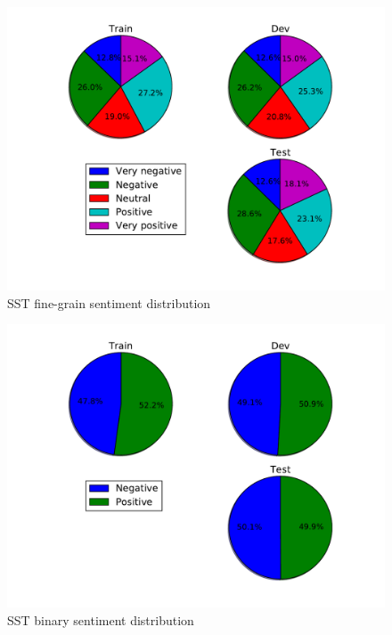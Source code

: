 \begin{figure}[H]
	\begin{minipage}{\textwidth}
		\centering
		\includegraphics[width=0.9\linewidth]{figure/sstfinegrain}
		\caption[SST fine-grain sentiment distribution]{SST fine-grain sentiment distribution}
		\label{fig:sstfinegrain}
	\end{minipage}
\end{figure}

\begin{figure}[H]
	\begin{minipage}{\textwidth}
		\centering
		\includegraphics[width=0.9\linewidth]{figure/sstbinary}
		\caption[SST binary sentiment distribution]{SST binary sentiment distribution}
		\label{fig:sstbinary}
	\end{minipage}
\end{figure}

